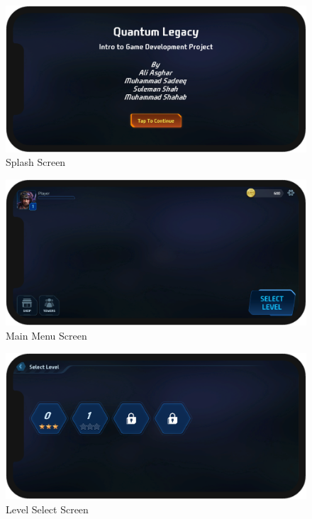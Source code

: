 \documentclass[12pt,a4paper]{report}
\begin{document}
\begin{figure}[h!]
	\centering
	\includegraphics[scale=0.5]{images/SplashScreen.png}
	\caption{Splash Screen}
	\label{fig:SplashScreen}
\end{figure}

\begin{figure}[h!]
	\centering
	\includegraphics[scale=0.5]{images/MainMenuScreen.png}
	\caption{Main Menu Screen}
	\label{fig:MainMenuScreen}
\end{figure}

\begin{figure}[h!]
	\centering
	\includegraphics[scale=0.5]{images/LevelSelectScreen.png}
	\caption{Level Select Screen}
	\label{fig:LevelSelectScreen}
\end{figure}
\end{document}
